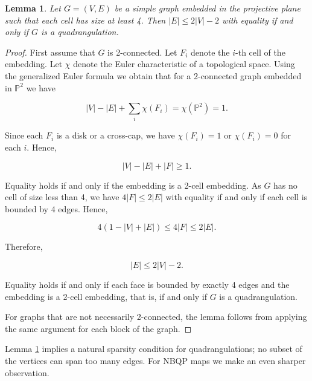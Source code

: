\documentclass{article}
\newtheorem{lemma}[theorem]{Lemma}
\newcommand{\Pb}[0]{\mathbb{P}}
\begin{document}
\begin{lemma}\label{lem:2nminus2isquad}
    Let $G=(V,E)$ be a simple graph embedded in the projective plane such that each cell has size at least 4. Then $|E|\le2|V|-2$ with equality if and only if $G$ is a quadrangulation. 
\end{lemma}
\begin{proof}
    First assume that $G$ is 2-connected. Let $F_i$ denote the $i$-th cell of the embedding. Let $\chi$ denote the Euler characteristic of a topological space. Using the generalized Euler formula we obtain that for a 2-connected graph embedded in $\Pb^2$ we have

    $$|V|-|E|+\sum_i\chi (F_i)=\chi(\Pb^2)=1.$$

    Since each $F_i$ is a disk or a cross-cap, we have $\chi(F_i)=1$ or $\chi(F_i)=0$ for each $i$. Hence,

    $$|V|-|E|+|F|\ge 1.$$

    Equality holds if and only if the embedding is a 2-cell embedding.   As $G$ has no cell of size less than 4, we have $4|F|\le 2|E|$ with equality if and only if each cell is bounded by 4 edges. Hence,

     $$ 4(1-|V|+|E|)\le 4|F|\le 2|E|.$$

    Therefore,
    
    $$|E|\le 2|V|-2.$$

    Equality holds if and only if each face is bounded by exactly 4 edges and the embedding is a 2-cell embedding, that is, if and only if $G$ is a quadrangulation.

    For graphs that are not necessarily 2-connected, the lemma follows from applying the same argument for each block of the graph. 


\end{proof}


 Lemma \ref{lem:2nminus2isquad} implies a natural sparsity condition for quadrangulations; no subset of the vertices can span too many edges. For NBQP maps we make an even sharper observation. 
\end{document}
